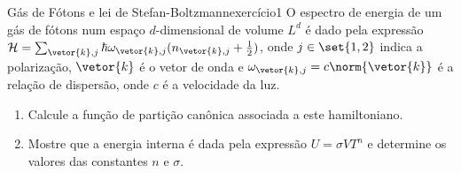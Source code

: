\begin{exercício}{Gás de Fótons e lei de Stefan-Boltzmann}{exercício1}
    O espectro de energia de um gás de fótons num espaço \(d\)-dimensional de volume \(L^d\) é dado pela expressão \(\mathcal{H} = \sum_{\vetor{k}, j} \hbar \omega_{\vetor{k}, j}(n_{\vetor{k}, j} + \frac12)\), onde \(j \in \set{1,2}\) indica a polarização, \(\vetor{k}\) é o vetor de onda e \(\omega_{\vetor{k},j} = c\norm{\vetor{k}}\) é a relação de dispersão, onde \(c\) é a velocidade da luz.
    \begin{enumerate}[label=(\alph*)]
        \item Calcule a função de partição canônica associada a este hamiltoniano.
        \item Mostre que a energia interna é dada pela expressão \(U = \sigma V T^n\) e determine os valores das constantes \(n\) e \(\sigma\).
    \end{enumerate}
\end{exercício}
